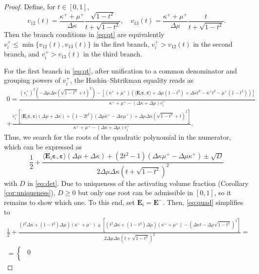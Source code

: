 \documentclass[10pt,a4paper]{amsart}
\newcommand{\Ei}{\tensf{E}_i}                       %
\newcommand{\Emin}{\tensf{E}^{-}}                   %
\newcommand{\strain}{\tenss{\varepsilon}}           %
\newcommand{\tensf}[1]{\bm{\mathbf{#1}}}            %
\newcommand{\tenss}[1]{\bm{\mathbf{#1}}}            %
\begin{document}
\begin{proof}
Define, for $t \in [0,1]$,
%
\begin{equation}
    v_{12} (t) = \frac{\kappa^+ + \mu^+}{\Delta\kappa} \frac{\sqrt{1-t^2}}{t + \sqrt{1-t^2}}, \quad v_{13} (t) = \frac{\kappa^+ + \mu^+}{\Delta\mu} \frac{t}{t + \sqrt{1-t^2}}.
\end{equation}
%
Then the branch conditions in \eqref{eq:qt} are equivalently $v_i^+ \le \min\{v_{12}(t), v_{13}(t)\}$ in the first branch, $v_i^+ > v_{12}(t)$ in the second branch, and $v_i^+ > v_{13}(t)$ in the third branch.

For the first branch in \eqref{eq:qt}, after unification to a common denominator and grouping powers of $v_i^+$, the Hashin--Shtrikman equality reads as
%
\begin{multline}
    0 = \frac{(v_i^+)^2 (-\Delta\mu \Delta\kappa (\sqrt{1-t^2} + t)^2) - [(\kappa^+ + \mu^+)(\langle\Ei\strain, \strain\rangle + \Delta\mu (1-t^2) + \Delta\kappa t^2 - \kappa^+ t^2 - \mu^+(1-t^2))]}{\kappa^+ + \mu^+ - (\Delta\kappa + \Delta\mu) v_i^+}\\
    + \frac{v_i^+\left[\langle\Ei\strain, \strain\rangle (\Delta\mu + \Delta\kappa) + (1 - 2t^2) (\Delta\mu \kappa^+ - \Delta\kappa\mu^+) + \Delta\mu \Delta\kappa (\sqrt{1-t^2} + t)^2\right]}{\kappa^+ + \mu^+ - (\Delta\kappa + \Delta\mu) v_i^+}.
\end{multline}
%
Thus, we search for the roots of the quadratic polynomial in the numerator, which can be expressed as
%
\begin{equation}\label{eq:quad}
    \frac{1}{2} + \frac{\langle\Ei\strain, \strain\rangle(\Delta\mu + \Delta\kappa) + (2t^2-1)(\Delta\kappa \mu^+ -\Delta\mu \kappa^+) \pm \sqrt{D}}{2 \Delta\mu \Delta\kappa (t + \sqrt{1 - t^2})^2}
\end{equation}
%
with $D$ in \eqref{eq:det}. Due to uniqueness of the activating volume fraction (Corollary \ref{cor:uniqueness}), $D\ge 0$ but only one root can be admissible in $[0,1]$, so it remains to show which one. To this end, set $\Ei=\Emin$. Then, \eqref{eq:quad} simplifies to
%
\begin{multline}
    \frac{1}{2}+\frac{(t^2\Delta\kappa + (1-t^2)\Delta\mu)(\kappa^- + \mu^-) \pm [(t^2\Delta\kappa + (1 - t^2)\Delta\mu) (\kappa^+ + \mu^+) - ( \Delta\kappa t - \Delta\mu \sqrt{1-t^2})^2]}{2 \Delta\mu \Delta\kappa (t + \sqrt{1 - t^2})^2} = \\
    = \begin{cases}
        \begin{aligned}0\end{aligned}\\

\end{cases}
\end{multline}
\end{proof}
\end{document}
